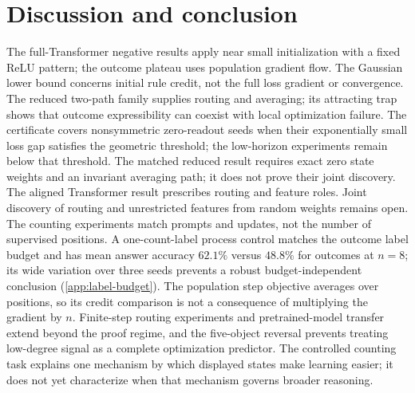 \section{Discussion and conclusion}
\label{sec:conclusion}
\label{sec:discussion}

The full-Transformer negative results apply near small initialization with a fixed
ReLU pattern; the outcome plateau uses population gradient flow.
The Gaussian lower bound concerns initial rule credit, not the full loss gradient
or convergence. The reduced two-path family supplies routing and averaging;
its attracting trap shows that outcome expressibility can coexist with local
optimization failure. The certificate covers nonsymmetric zero-readout seeds when their exponentially
small loss gap satisfies the geometric threshold; the low-horizon experiments
remain below that threshold. The matched reduced result requires exact zero state
weights and an invariant averaging path; it does not prove their joint discovery.
The aligned Transformer result prescribes routing and feature roles. Joint discovery
of routing and unrestricted features from random weights remains open.
The counting experiments match prompts and updates, not the number of supervised
positions. A one-count-label process control matches the outcome label budget and has mean
answer accuracy $62.1\%$ versus $48.8\%$ for outcomes at $n=8$; its wide variation
over three seeds prevents a robust budget-independent conclusion
(\cref{app:label-budget}). The population step objective averages
over positions, so its credit comparison is not a consequence of multiplying the gradient by $n$.
Finite-step routing experiments and pretrained-model transfer extend beyond the proof regime,
and the five-object reversal prevents treating low-degree signal as a complete optimization
predictor. The controlled counting task explains one mechanism by which displayed states
make learning easier; it does not yet characterize when that mechanism governs broader reasoning.
